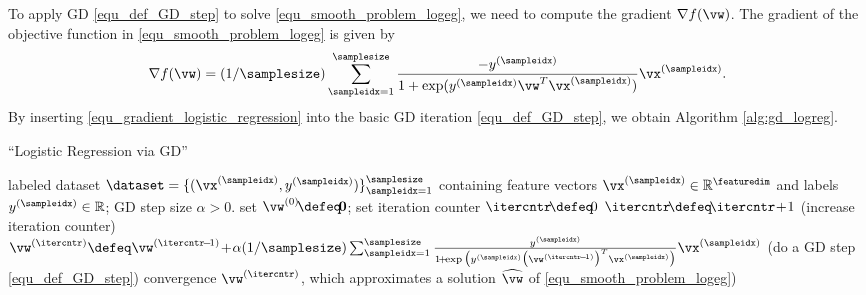 \documentclass[12pt]{report}
\begin{document}
To apply GD \eqref{equ_def_GD_step} to solve \eqref{equ_smooth_problem_logeg}, 
we need to compute the gradient $\nabla f(\vw)$. 
The gradient of the objective function in \eqref{equ_smooth_problem_logeg} is given by 
\begin{equation}
\label{equ_gradient_logistic_regression}
\nabla f(\vw) = (1/\samplesize) \sum_{\sampleidx=1}^{\samplesize} \frac{-y^{(\sampleidx)}}{1 + \exp ( y^{(\sampleidx)} \vw^{T} \vx^{(\sampleidx)})} \vx^{(\sampleidx)}.
\end{equation} 
By inserting \eqref{equ_gradient_logistic_regression} into the basic GD iteration \eqref{equ_def_GD_step}, we obtain Algorithm \ref{alg:gd_logreg}. 
\begin{algorithm}[htbp]
\caption{``Logistic Regression via GD''}\label{alg:gd_logreg}
\begin{algorithmic}[1]
\renewcommand{\algorithmicrequire}{\textbf{Input:}}
\renewcommand{\algorithmicensure}{\textbf{Output:}}
\Require   labeled dataset $\dataset=\{ (\vx^{(\sampleidx)}, y^{(\sampleidx)}) \}_{\sampleidx=1}^{\samplesize}$ containing feature vectors 
$\vx^{(\sampleidx)} \in \mathbb{R}^{\featuredim}$ and labels $y^{(\sampleidx)} \in \mathbb{R}$; GD step size $\alpha >0$. 
\Statex\hspace{-6mm}{\bf Initialize:}set $\vw^{(0)}\!\defeq\!\mathbf{0}$; set iteration counter $\itercntr\!\defeq\!0$   
\Repeat 
\State $\itercntr\!\defeq\! \itercntr\!+\!1$    (increase iteration counter) 
\State  $\vw^{(\itercntr)} \defeq \vw^{(\itercntr\!-\!1)}\!+\!\alpha (1/\samplesize) \sum_{\sampleidx=1}^{\samplesize} \frac{y^{(\sampleidx)}}{1\!+\!\exp \big( y^{(\sampleidx)} \big(\vw^{(\itercntr\!-\!1)}\big)^{T} \vx^{(\sampleidx)}\big)} \vx^{(\sampleidx)}$  (do a GD step \eqref{equ_def_GD_step})
\Until convergence 
\Ensure $\vw^{(\itercntr)}$, which approximates a solution $\widehat{\vw}$ of \eqref{equ_smooth_problem_logeg})
\end{algorithmic}
\end{algorithm}
\end{document}
